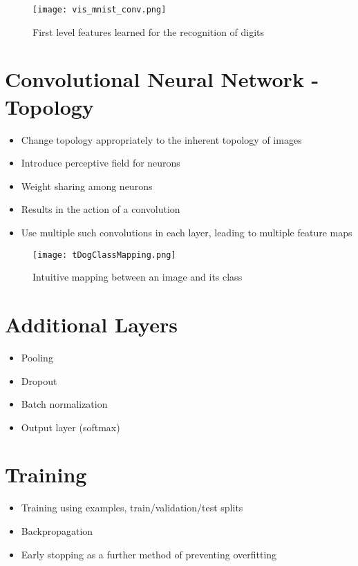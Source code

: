 \documentclass[10pt,a4paper]{report}
\begin{document}
\begin{figure}
\centering
  \texttt{[image: vis\_mnist\_conv.png]}
  \caption{First level features learned for the recognition of digits}
  \label{fig:ANN}
\end{figure}

\section{Convolutional Neural Network - Topology}
\begin{itemize}
\item Change topology appropriately to the inherent topology of images
\item Introduce perceptive field for neurons
\item Weight sharing among neurons
\item Results in the action of a convolution
\item Use multiple such convolutions in each layer, leading to multiple feature maps

\end{itemize}
\begin{figure}
\centering
  \texttt{[image: tDogClassMapping.png]}
  \caption{Intuitive mapping between an image and its class}
  \label{fig:ANN}
\end{figure}

\section{Additional Layers}
\begin{itemize}
\item Pooling
\item Dropout
\item Batch normalization
\item Output layer (softmax)
\end{itemize}

\section{Training}
\begin{itemize}
\item Training using examples, train/validation/test splits
\item Backpropagation
\item Early stopping as a further method of preventing overfitting
\end{itemize}
\end{document}
